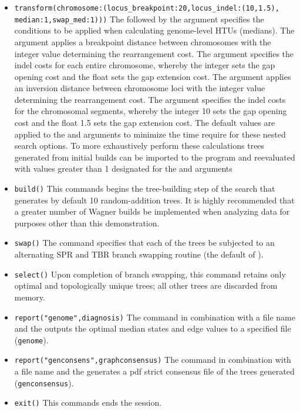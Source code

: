 \begin{itemize}
\item \texttt{transform(chromosome:(locus\_breakpoint:20,locus\_indel:(10,1.5),\\median:1,swap\_med:1)))}  The  followed by the argument  specifies the conditions to be applied when calculating genome-level HTUs (medians). The argument  applies a breakpoint distance between chromosomes with the integer value determining the rearrangement cost. The argument  specifies the indel costs for each entire chromosome, whereby the integer sets the gap opening cost and the float sets the gap extension cost.  The argument  applies an inversion distance between chromosome loci with the integer value determining the rearrangement cost. The argument  specifies the indel costs for the chromosomal segments, whereby the integer 10 sets the gap opening cost and the float 1.5 sets the gap extension cost.  The default values are applied to the  and  arguments to minimize the time require for these nested search options.   To more exhaustively perform these calculations trees generated from initial builds can be imported to the program and reevaluated with values greater than 1 designated for the  and  arguments
\item \texttt{build()} This commands begins the tree-building step of the search that generates by default 10 random-addition trees.  It is highly recommended that a greater number of Wagner builds be implemented when analyzing data for purposes other than this demonstration.
\item \texttt{swap()} The  command specifies that each of the trees be subjected to an alternating SPR and TBR branch swapping routine (the default of \poy).
\item \texttt{select()} Upon completion of branch swapping, this command retains only optimal and topologically unique trees; all other trees are discarded from memory. 
\item \texttt{report("genome",diagnosis)}  The  command in combination with a file name and the  outputs the optimal median states and edge values to a specified file (\texttt{genome}). 
\item \texttt{report("genconsens",graphconsensus)}  The  command in combination with a file name and the  generates a pdf strict consensus file of the trees generated (\texttt{genconsensus}). 
\item \texttt{exit()} This commands ends the \poy session.
\end{itemize}

